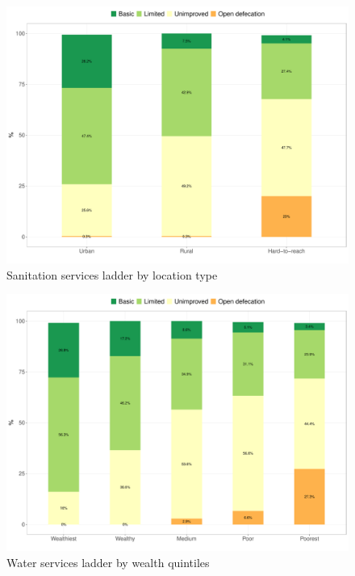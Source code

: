 \documentclass[12pt,a4paper]{article}
\begin{document}
\newpage

\begin{figure}[H]

{\centering \includegraphics{kayahReport_files/figure-latex/san1plot-1} 

}

\caption{Sanitation services ladder by location type}\label{fig:san1plot}
\end{figure}

\begin{figure}[H]

{\centering \includegraphics{kayahReport_files/figure-latex/san2plot-1} 

}

\caption{Water services ladder by wealth quintiles}\label{fig:san2plot}
\end{figure}
\end{document}
